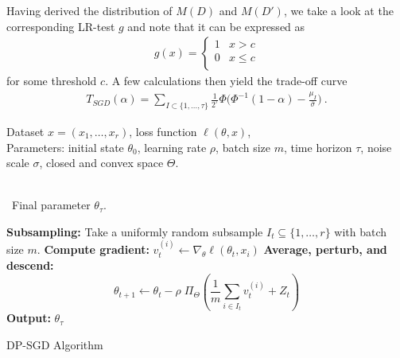 Having derived the distribution of $M(D)$ and $M(D')$, we take a look at the corresponding LR-test $g$ and note that it can be expressed as
\begin{align*}
    g(x) = \begin{cases}
       1  & x > c \\
       0  & x \leq c \\
    \end{cases}
\end{align*}
for some threshold $c$. A few calculations then yield the trade-off curve
\begin{align*}
    T_{SGD}(\alpha)=\sum_{I\subset \{1,\hdots, \tau\}} \frac{1}{2^{\tau}}\Phi\Big(\Phi^{-1} (1-\alpha)-\frac{\mu_I}{\bar\sigma}\Big)~.
\end{align*}

\begin{algorithm}[h]
\footnotesize
\algorithmicrequire \; \parbox[t]{\dimexpr0.9\linewidth-\algorithmicindent}{Dataset $x = (x_1, \ldots, x_r)$, loss function $\ell(\theta, x)$,\\ Parameters: initial state $\theta_0$, learning rate $\rho$, batch size $m$, time horizon $\tau$, noise scale $\sigma$, closed and convex space $\Theta$.}\\[0.1cm]
\algorithmicensure \, Final parameter $\theta_{\tau}$.
\begin{algorithmic}[1]
        \State \textbf{Subsampling:} Take a uniformly random subsample $I_t \subseteq \{1, \ldots, r\}$ with batch size $m$.
            \State \textbf{Compute gradient:} $v_t^{(i)} \leftarrow \nabla_\theta \ell(\theta_t, x_i)$
        \EndFor
        \State \textbf{Average, perturb, and descend:}
        \[
        \theta_{t+1} \leftarrow \theta_t - \rho \; \Pi_{\Theta} \left( \frac{1}{m} \sum_{i \in I_t} v_t^{(i)} + Z_t \right)
        \]
    \EndFor
    \State \textbf{Output:} $\theta_{\tau}$
\end{algorithmic}
\caption{DP-SGD Algorithm}
\label{alg:noisy_sgd}
\end{algorithm}



